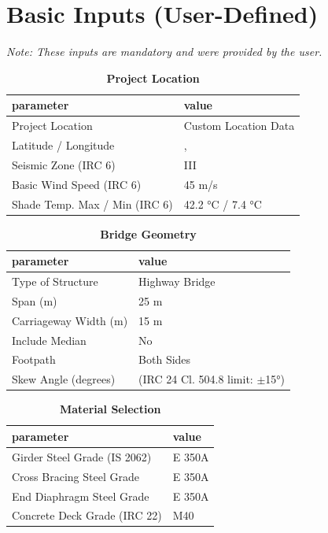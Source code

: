 \documentclass[12pt,a4paper]{report}
\numberwithin{table}{chapter}
\numberwithin{figure}{chapter}
\begin{document}
\section{Basic Inputs (User-Defined)}
\label{sec:basic-inputs}

\noindent\textit{Note: These inputs are mandatory and were provided by the user.}

\begin{table}[H]
\caption{\textbf{Project Location}}
\label{subsec:project-location}
\begin{tabular}{|L{5.5cm}|L{8.5cm}|}
\hline
\textbf{parameter} & \textbf{value} \\
\hline
\textnormal{Project Location} & Custom Location Data \\
\hline
\textnormal{Latitude / Longitude} & ,  \\
\hline
\textnormal{Seismic Zone (IRC 6)} & III \\
\hline
\textnormal{Basic Wind Speed (IRC 6)} & 45 m/s \\
\hline
\textnormal{Shade Temp. Max / Min (IRC 6)} & 42.2 °C / 7.4 °C \\
\hline
\end{tabular}
\vspace{0.4cm}
\end{table}

\begin{table}[H]
\caption{\textbf{Bridge Geometry}}
\label{subsec:bridge-geometry}
\begin{tabular}{|L{5.5cm}|L{8.5cm}|}
\hline
\textbf{parameter} & \textbf{value} \\
\hline
\textnormal{Type of Structure} & Highway Bridge \\
\hline
\textnormal{Span (m)} & 25 m \\
\hline
\textnormal{Carriageway Width (m)} & 15 m \\
\hline
\textnormal{Include Median} & No \\
\hline
\textnormal{Footpath} & Both Sides \\
\hline
\textnormal{Skew Angle (degrees)} &  (IRC 24 Cl. 504.8 limit: $\pm$15°) \\
\hline
\end{tabular}
\end{table}
\vspace{0.4cm}

\begin{table}[H]
\caption{\textbf{Material Selection}}
\label{subsec:material}
\begin{tabular}{|L{5.5cm}|L{8.5cm}|}
\hline
\textbf{parameter} & \textbf{value} \\
\hline
\textnormal{Girder Steel Grade (IS 2062)} & E 350A \\
\hline
\textnormal{Cross Bracing Steel Grade} & E 350A \\
\hline
\textnormal{End Diaphragm Steel Grade} & E 350A \\
\hline
\textnormal{Concrete Deck Grade (IRC 22)} & M40 \\
\hline
\end{tabular}
\end{table}
\vspace{0.4cm}
\end{document}
